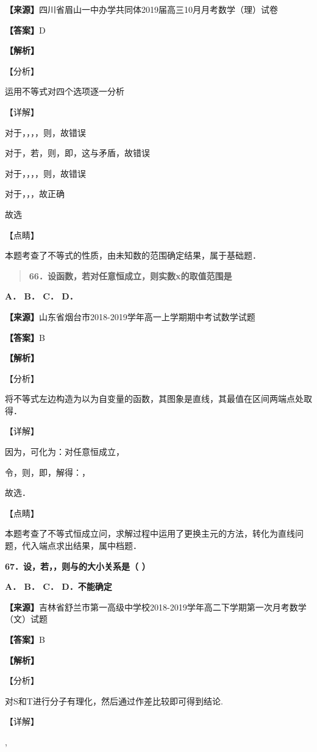 \documentclass[
]{article}
\begin{document}
\textbf{【来源】}四川省眉山一中办学共同体2019届高三10月月考数学（理）试卷

\textbf{【答案】}D

\textbf{【解析】}

【分析】

运用不等式对四个选项逐一分析

【详解】

对于，，，，则，故错误

对于，若，则，即，这与矛盾，故错误

对于，，，，则，故错误

对于，，，故正确

故选

【点睛】

本题考查了不等式的性质，由未知数的范围确定结果，属于基础题．

\begin{quote}
\textbf{66．设函数，若对任意恒成立，则实数x的取值范围是　　}
\end{quote}

\textbf{A． B． C． D．}

\textbf{【来源】}山东省烟台市2018-2019学年高一上学期期中考试数学试题

\textbf{【答案】}B

\textbf{【解析】}

【分析】

将不等式左边构造为以为自变量的函数，其图象是直线，其最值在区间两端点处取得．

【详解】

因为，可化为：对任意恒成立，

令，则，即，解得：，

故选．

【点睛】

本题考查了不等式恒成立问，求解过程中运用了更换主元的方法，转化为直线问题，代入端点求出结果，属中档题．

\textbf{67．设，若，，则与的大小关系是（ ）}

\textbf{A． B． C． D．不能确定}

\textbf{【来源】}吉林省舒兰市第一高级中学校2018-2019学年高二下学期第一次月考数学（文）试题

\textbf{【答案】}B

\textbf{【解析】}

【分析】

对S和T进行分子有理化，然后通过作差比较即可得到结论.

【详解】

,
\end{document}
